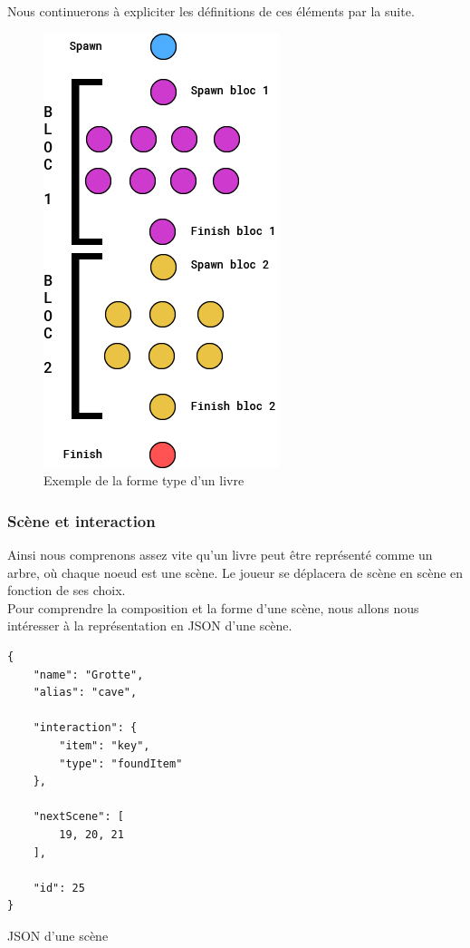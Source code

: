 \documentclass[12pt]{article}
\begin{document}
Nous continuerons à expliciter les définitions de ces éléments par la suite.

\begin{figure}[h]
    \centering
    \includegraphics[scale=0.5]{exemple_tree.jpg}
    \caption{Exemple de la forme type d'un livre}
\end{figure}

\subsubsection{Scène et interaction}
Ainsi nous comprenons assez vite qu'un livre peut être représenté comme un arbre, où chaque noeud est une scène. Le joueur se déplacera de scène en scène en fonction de ses choix.\\
Pour comprendre la composition et la forme d'une scène, nous allons nous intéresser à la représentation en JSON d'une scène.\\

\begin{listing}[h]
\begin{verbatim}
{     
    "name": "Grotte",
    "alias": "cave",
    
    "interaction": {
        "item": "key",
        "type": "foundItem"
    },
    
    "nextScene": [
        19, 20, 21
    ],
    
    "id": 25
}
\end{verbatim}
\caption{JSON d'une scène} 
\end{listing}
\end{document}
